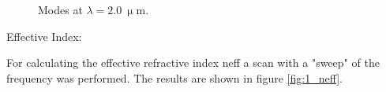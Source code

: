 \begin{figure}[h]%
\centering
\caption{Modes at $\lambda = 2.0~\upmu$m.}%
\label{fig:1_2_02}%
\end{figure}

Effective Index:

For calculating the effective refractive index neff a scan with a "sweep" of the frequency was performed. The results are shown in figure \ref{fig:1_neff}.

